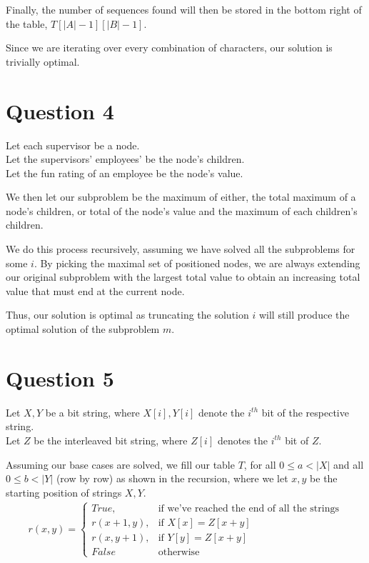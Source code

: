 \documentclass{article}
\begin{document}
Finally, the number of sequences found will then be stored in the bottom right of the table, $T[|A|-1][|B|-1]$.

Since we are iterating over every combination of characters, our solution is trivially optimal.

\pagebreak
\section*{Question 4}
Let each supervisor be a node.\\
Let the supervisors' employees' be the node's children.\\
Let the fun rating of an employee be the node's value.

We then let our subproblem be the maximum of either, the total maximum of a node's children, or total of the node's value and the maximum of each children's children.

We do this process recursively, assuming we have solved all the subproblems for some $i$. By picking the maximal set of positioned nodes, we are always extending our original subproblem with the largest total value to obtain an increasing total value that must end at the current node.

Thus, our solution is optimal as truncating the solution $i$ will still produce the optimal solution of the subproblem $m$.

\section*{Question 5}
Let $X, Y$ be a bit string, where $X[i], Y[i]$ denote the $i^{th}$ bit of the respective string.\\
Let $Z$ be the interleaved bit string, where $Z[i]$ denotes the $i^{th}$ bit of $Z$.

Assuming our base cases are solved, we fill our table $T$, for all $0 \leq a < |X|$ and all $0 \leq b < |Y|$ (row by row) as shown in the recursion, where we let $x, y$ be the starting position of strings $X, Y$.
\begin{align*}
r(x, y) =
\begin{cases}
    True,       & \text{if we've reached the end of all the strings}\\
    r(x+1, y),  & \text{if } X[x] = Z[x + y]\\
    r(x, y+1),  & \text{if } Y[y] = Z[x + y]\\
    False       & \text{otherwise}
\end{cases}
\end{align*}
\end{document}
